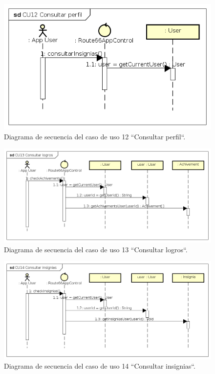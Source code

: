 \documentclass[twoside]{report}
\begin{document}
\begin{figure}[H]
\begin{center}
\includegraphics[scale=0.75]{images/sequence/CU12}
\caption{Diagrama de secuencia del caso de uso 12 “Consultar perfil“.}
\end{center}
\end{figure}

\begin{figure}[H]
\begin{center}
\includegraphics[width=\textwidth]{images/sequence/CU13}
\caption{Diagrama de secuencia del caso de uso 13 “Consultar logros“.}
\end{center}
\end{figure}

\begin{figure}[H]
\begin{center}
\includegraphics[width=\textwidth]{images/sequence/CU14}
\caption{Diagrama de secuencia del caso de uso 14 “Consultar insignias“.}
\end{center}
\end{figure}
\end{document}
